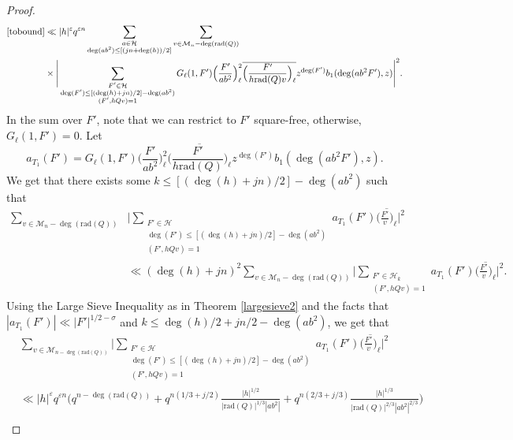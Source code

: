 \documentclass[12pt]{amsart}
\begin{document}
\begin{proof}
 \begin{align*}
 \eqref{tobound} & \ll |h|^{\varepsilon} q^{\varepsilon n} \sum_{\substack{a \in \mathcal{H} \\ \deg(ab^2) \leq [(jn+\deg(h))/2]}} \sum_{v \in \mathcal{M}_n - \deg(\text{rad}(Q))} \\
 & \times  \Bigg| \sum_{\substack{F'\in \mathcal{H} \\ \deg(F') \leq [(\deg(h)+jn)/2]-\deg(ab^2) \\ (F',hQv)=1}} G_{\ell}(1,F') \Big(  \frac{F'}{ab^2}\Big)_{\ell}^2 \overline{\Big( \frac{F'}{h \text{rad}(Q)v}\Big)_{\ell} } z^{\deg(F')} b_1(\deg(ab^2F'),z) \Bigg|^2.
 \end{align*}
 In the sum over $F'$, note that we can restrict to $F'$ square-free, otherwise, $G_{\ell}(1,F') =0$. Let 
 $$a_{T_1}(F') = G_{\ell}(1,F') \Big(  \frac{F'}{ab^2}\Big)_{\ell}^2 \overline{\Big( \frac{F'}{h\text{rad}(Q)}\Big)_{\ell} } z^{\deg(F')} b_1(\deg(ab^2F'),z).$$
 We get that there exists some $k \leq [ (\deg(h)+jn)/2]-\deg(ab^2)$ such that
 \begin{align*}
 \sum_{v \in \mathcal{M}_n - \deg(\text{rad}(Q))}& \Bigg|  \sum_{\substack{F' \in \mathcal{H} \\ \deg(F') \leq [(\deg(h)+jn)/2]-\deg(ab^2) \\ (F',hQv)=1}} a_{T_1}(F') \overline{\Big( \frac{F'}{v}\Big)_{\ell}} \Bigg|^2\\ &\ll (\deg(h)+jn)^2 \sum_{v \in \mathcal{M}_n - \deg(\text{rad}(Q))} \Bigg| \sum_{\substack{F' \in \mathcal{H}_k \\ (F',hQv)=1}} a_{T_1}(F') \overline{\Big( \frac{F'}{v}\Big)_{\ell}} \Bigg|^2.
 \end{align*}
 Using the Large Sieve Inequality as in Theorem \ref{largesieve2} and the facts that $|a_{T_1}(F')| \ll |F'|^{1/2-\sigma}$ and $k \leq \deg(h)/2+jn/2-\deg(ab^2)$, we get that
 \begin{align}
& \sum_{v \in \mathcal{M}_{n - \deg(\text{rad}(Q))}}  \Bigg| \sum_{\substack{F' \in \mathcal{H} \\  \deg(F') \leq [(\deg(h)+jn)/2]-\deg(ab^2) \nonumber  \\ (F',hQv)=1}} a_{T_1}(F') \overline{\Big( \frac{F'}{v}\Big)_{\ell}} \Bigg|^2\\
 &  \ll |h|^{\varepsilon} q^{\varepsilon n} \Bigg(q^{n-\deg(\text{rad}(Q))}+q^{n(1/3+j/2)} \frac{|h|^{1/2}}{|\text{rad}(Q)|^{1/3} |ab^2|}+q^{n(2/3+j/3)} \frac{|h|^{1/3}}{|\text{rad}(Q)|^{2/3}|ab^2|^{2/3}} \Bigg)   \nonumber \\

\end{align}
\end{proof}
\end{document}
